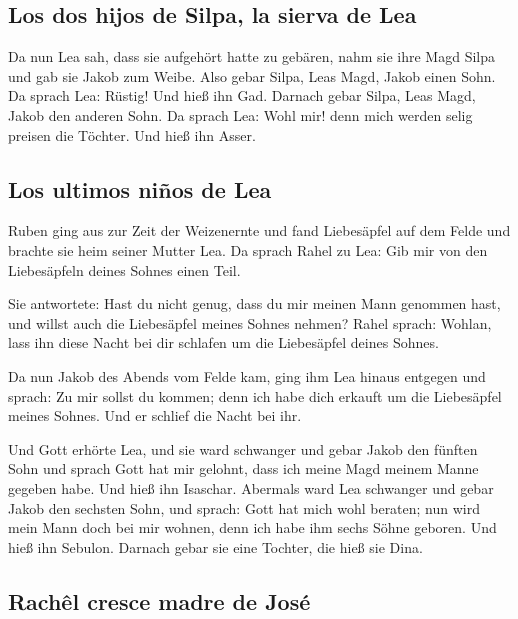 \hypertarget{los-dos-hijos-de-silpa-la-sierva-de-lea}{%
\subsection{Los dos hijos de Silpa, la sierva de
Lea}\label{los-dos-hijos-de-silpa-la-sierva-de-lea}}

 Da nun Lea sah, dass sie aufgehört hatte zu gebären, nahm
sie ihre Magd Silpa und gab sie Jakob zum Weibe.  Also
gebar Silpa, Leas Magd, Jakob einen Sohn.  Da sprach Lea:
Rüstig! Und hieß ihn Gad.  Darnach gebar Silpa, Leas
Magd, Jakob den anderen Sohn.  Da sprach Lea: Wohl mir!
denn mich werden selig preisen die Töchter. Und hieß ihn Asser.

\hypertarget{los-ultimos-niuxf1os-de-lea}{%
\subsection{Los ultimos niños de
Lea}\label{los-ultimos-niuxf1os-de-lea}}

 Ruben ging aus zur Zeit der Weizenernte und fand
Liebesäpfel auf dem Felde und brachte sie heim seiner Mutter Lea. Da
sprach Rahel zu Lea: Gib mir von den Liebesäpfeln deines Sohnes einen
Teil.

 Sie antwortete: Hast du nicht genug, dass du mir meinen
Mann genommen hast, und willst auch die Liebesäpfel meines Sohnes
nehmen? Rahel sprach: Wohlan, lass ihn diese Nacht bei dir schlafen um
die Liebesäpfel deines Sohnes.

 Da nun Jakob des Abends vom Felde kam, ging ihm Lea
hinaus entgegen und sprach: Zu mir sollst du kommen; denn ich habe dich
erkauft um die Liebesäpfel meines Sohnes. Und er schlief die Nacht bei
ihr.

 Und Gott erhörte Lea, und sie ward schwanger und gebar
Jakob den fünften Sohn  und sprach Gott hat mir gelohnt,
dass ich meine Magd meinem Manne gegeben habe. Und hieß ihn Isaschar.
 Abermals ward Lea schwanger und gebar Jakob den sechsten
Sohn,  und sprach: Gott hat mich wohl beraten; nun wird
mein Mann doch bei mir wohnen, denn ich habe ihm sechs Söhne geboren.
Und hieß ihn Sebulon.  Darnach gebar sie eine Tochter,
die hieß sie Dina.

\hypertarget{rachuxeal-cresce-madre-de-josuxe9}{%
\subsection{Rachêl cresce madre de
José}\label{rachuxeal-cresce-madre-de-josuxe9}}

